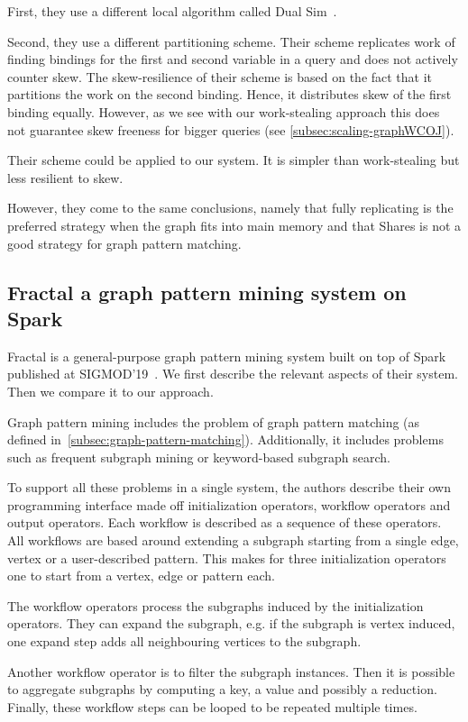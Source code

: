 First, they use a different local algorithm called Dual Sim~\cite{dualsim}.

Second, they use a different partitioning scheme.
Their scheme replicates work of finding bindings for the first and second variable in a query and does not actively counter skew.
The skew-resilience of their scheme is based on the fact that it partitions the work on the second
binding.
Hence, it distributes skew of the first binding equally.
However, as we see with our work-stealing approach this does not guarantee skew freeness for
bigger queries (see \cref{subsec:scaling-graphWCOJ}).

Their scheme could be applied to our system.
It is simpler than work-stealing but less resilient to skew.

However, they come to the same conclusions, namely that fully replicating is the preferred strategy
when the graph fits into main memory and that Shares is not a good strategy for graph pattern matching.

\subsection{Fractal a graph pattern mining system on Spark} \label{subsec:fractal}
Fractal is a general-purpose graph pattern mining system built on top of Spark published at SIGMOD'19~\cite{fractal}.
We first describe the relevant aspects of their system.
Then we compare it to our approach.

Graph pattern mining includes the problem of graph pattern matching (as defined in~\cref{subsec:graph-pattern-matching}).
Additionally, it includes problems such as frequent subgraph mining or keyword-based subgraph search.

To support all these problems in a single system, the authors describe their own programming interface made
off initialization operators, workflow operators and output operators.
Each workflow is described as a sequence of these operators.
All workflows are based around extending a subgraph starting from a single edge, vertex or a user-described
pattern.
This makes for three initialization operators one to start from a vertex, edge or pattern each.

The workflow operators process the subgraphs induced by the initialization operators.
They can expand the subgraph, e.g. if the subgraph is vertex induced, one expand step adds all neighbouring
vertices to the subgraph.

Another workflow operator is to filter the subgraph instances.
Then it is possible to aggregate subgraphs by computing a key, a value and possibly a reduction.
Finally, these workflow steps can be looped to be repeated multiple times.

